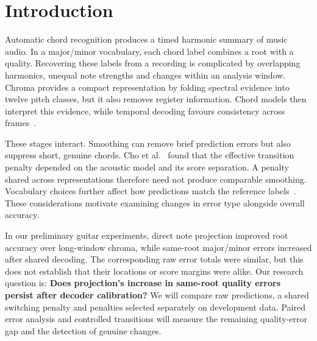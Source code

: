 \section{Introduction}
Automatic chord recognition produces a timed harmonic summary of music audio. In a major/minor vocabulary, each chord label combines a root with a quality. Recovering these labels from a recording is complicated by overlapping harmonics, unequal note strengths and changes within an analysis window. Chroma provides a compact representation by folding spectral evidence into twelve pitch classes, but it also removes register information. Chord models then interpret this evidence, while temporal decoding favours consistency across frames\ \cite{mcvicar2014,pauwels2019,mueller2021fmp}.

These stages interact. Smoothing can remove brief prediction errors but also suppress short, genuine chords. Cho et al.\ \cite{cho2010} found that the effective transition penalty depended on the acoustic model and its score separation. A penalty shared across representations therefore need not produce comparable smoothing. Vocabulary choices further affect how predictions match the reference labels\ \cite{humphrey2015}. These considerations motivate examining changes in error type alongside overall accuracy.

In our preliminary guitar experiments, direct note projection improved root accuracy over long-window chroma, while same-root major/minor errors increased after shared decoding. The corresponding raw error totals were similar, but this does not establish that their locations or score margins were alike. Our research question is: \textbf{Does projection's increase in same-root quality errors persist after decoder calibration?} We will compare raw predictions, a shared switching penalty and penalties selected separately on development data. Paired error analysis and controlled transitions will measure the remaining quality-error gap and the detection of genuine changes.
